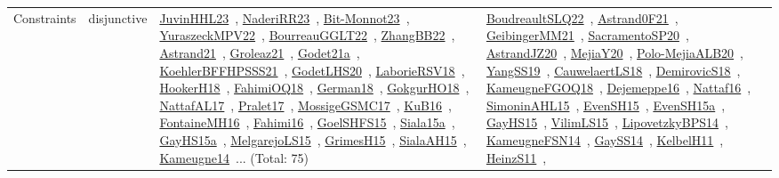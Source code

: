 {\begin{longtable}{lp{3cm}>{\raggedright\arraybackslash}p{6cm}>{\raggedright\arraybackslash}p{6cm}>{\raggedright\arraybackslash}p{8cm}}
Constraints & disjunctive & \href{works/JuvinHHL23.pdf}{JuvinHHL23}~\cite{JuvinHHL23}, \href{works/NaderiRR23.pdf}{NaderiRR23}~\cite{NaderiRR23}, \href{works/Bit-Monnot23.pdf}{Bit-Monnot23}~\cite{Bit-Monnot23}, \href{works/YuraszeckMPV22.pdf}{YuraszeckMPV22}~\cite{YuraszeckMPV22}, \href{works/BourreauGGLT22.pdf}{BourreauGGLT22}~\cite{BourreauGGLT22}, \href{works/ZhangBB22.pdf}{ZhangBB22}~\cite{ZhangBB22}, \href{works/Astrand21.pdf}{Astrand21}~\cite{Astrand21}, \href{works/Groleaz21.pdf}{Groleaz21}~\cite{Groleaz21}, \href{works/Godet21a.pdf}{Godet21a}~\cite{Godet21a}, \href{works/KoehlerBFFHPSSS21.pdf}{KoehlerBFFHPSSS21}~\cite{KoehlerBFFHPSSS21}, \href{works/GodetLHS20.pdf}{GodetLHS20}~\cite{GodetLHS20}, \href{works/LaborieRSV18.pdf}{LaborieRSV18}~\cite{LaborieRSV18}, \href{works/HookerH18.pdf}{HookerH18}~\cite{HookerH18}, \href{works/FahimiOQ18.pdf}{FahimiOQ18}~\cite{FahimiOQ18}, \href{works/German18.pdf}{German18}~\cite{German18}, \href{works/GokgurHO18.pdf}{GokgurHO18}~\cite{GokgurHO18}, \href{works/NattafAL17.pdf}{NattafAL17}~\cite{NattafAL17}, \href{works/Pralet17.pdf}{Pralet17}~\cite{Pralet17}, \href{works/MossigeGSMC17.pdf}{MossigeGSMC17}~\cite{MossigeGSMC17}, \href{works/KuB16.pdf}{KuB16}~\cite{KuB16}, \href{works/FontaineMH16.pdf}{FontaineMH16}~\cite{FontaineMH16}, \href{works/Fahimi16.pdf}{Fahimi16}~\cite{Fahimi16}, \href{works/GoelSHFS15.pdf}{GoelSHFS15}~\cite{GoelSHFS15}, \href{works/Siala15a.pdf}{Siala15a}~\cite{Siala15a}, \href{works/GayHS15a.pdf}{GayHS15a}~\cite{GayHS15a}, \href{works/MelgarejoLS15.pdf}{MelgarejoLS15}~\cite{MelgarejoLS15}, \href{works/GrimesH15.pdf}{GrimesH15}~\cite{GrimesH15}, \href{works/SialaAH15.pdf}{SialaAH15}~\cite{SialaAH15}, \href{works/Kameugne14.pdf}{Kameugne14}~\cite{Kameugne14}... (Total: 75) & \href{works/BoudreaultSLQ22.pdf}{BoudreaultSLQ22}~\cite{BoudreaultSLQ22}, \href{works/Astrand0F21.pdf}{Astrand0F21}~\cite{Astrand0F21}, \href{works/GeibingerMM21.pdf}{GeibingerMM21}~\cite{GeibingerMM21}, \href{works/SacramentoSP20.pdf}{SacramentoSP20}~\cite{SacramentoSP20}, \href{works/AstrandJZ20.pdf}{AstrandJZ20}~\cite{AstrandJZ20}, \href{works/MejiaY20.pdf}{MejiaY20}~\cite{MejiaY20}, \href{works/Polo-MejiaALB20.pdf}{Polo-MejiaALB20}~\cite{Polo-MejiaALB20}, \href{works/YangSS19.pdf}{YangSS19}~\cite{YangSS19}, \href{works/CauwelaertLS18.pdf}{CauwelaertLS18}~\cite{CauwelaertLS18}, \href{works/DemirovicS18.pdf}{DemirovicS18}~\cite{DemirovicS18}, \href{works/KameugneFGOQ18.pdf}{KameugneFGOQ18}~\cite{KameugneFGOQ18}, \href{works/Dejemeppe16.pdf}{Dejemeppe16}~\cite{Dejemeppe16}, \href{works/Nattaf16.pdf}{Nattaf16}~\cite{Nattaf16}, \href{works/SimoninAHL15.pdf}{SimoninAHL15}~\cite{SimoninAHL15}, \href{works/EvenSH15.pdf}{EvenSH15}~\cite{EvenSH15}, \href{works/EvenSH15a.pdf}{EvenSH15a}~\cite{EvenSH15a}, \href{works/GayHS15.pdf}{GayHS15}~\cite{GayHS15}, \href{works/VilimLS15.pdf}{VilimLS15}~\cite{VilimLS15}, \href{works/LipovetzkyBPS14.pdf}{LipovetzkyBPS14}~\cite{LipovetzkyBPS14}, \href{works/KameugneFSN14.pdf}{KameugneFSN14}~\cite{KameugneFSN14}, \href{works/GaySS14.pdf}{GaySS14}~\cite{GaySS14}, \href{works/KelbelH11.pdf}{KelbelH11}~\cite{KelbelH11}, \href{works/HeinzS11.pdf}{HeinzS11}~\cite{HeinzS11}, 
\end{longtable}}
